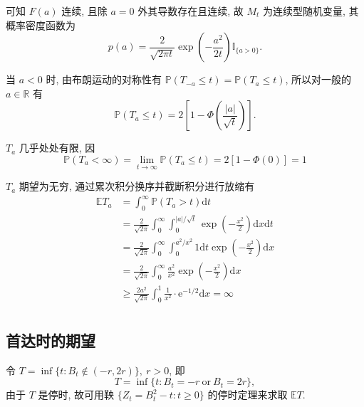 \documentclass[openany]{ctexbook}
\theoremstyle{kaiti}
\theoremstyle{normal}
\begin{document}
可知 $F(a)$ 连续, 且除 $a=0$ 外其导数存在且连续, 故 $M_t$ 为连续型随机变量, 其概率密度函数为
\begin{equation}
  p(a)=\frac{2}{\sqrt{2\pi t}}\exp\left(-\frac{a^2}{2t}\right)\mathbb{I}_{\{a>0\}}.
\end{equation}

当 $a<0$ 时, 由布朗运动的对称性有 $\mathbb{P}(T_{-a}\leqslant t)=\mathbb{P}(T_a\leqslant t)$, 所以对一般的 $a\in\mathbb{R}$ 有
\begin{equation}
  \mathbb{P}(T_a\leqslant t)=2\left[1-\Phi\left(\frac{|a|}{\sqrt{t}}\right)\right].
\end{equation}

$T_a$ 几乎处处有限, 因
\begin{equation}
  \mathbb{P}(T_a<\infty)=\lim_{t\to\infty}\mathbb{P}(T_a\leqslant t)=2[1-\Phi(0)]=1
\end{equation}

$T_a$ 期望为无穷, 通过累次积分换序并截断积分进行放缩有
\begin{equation}
  \begin{aligned}
    \mathbb{E}T_a
    &=\int_0^\infty \mathbb{P}(T_a>t)\mathrm{d}t\\
    &=\frac{2}{\sqrt{2\pi}}\int_0^\infty \int_0^{|a|/\sqrt{t}}\exp\left(-\frac{x^2}{2}\right)\mathrm{d}x\mathrm{d}t\\
    &=\frac{2}{\sqrt{2\pi}}\int_0^\infty \int_0^{a^2/x^2}1\mathrm{d}t\exp\left(-\frac{x^2}{2}\right)\mathrm{d}x\\
    &=\frac{2}{\sqrt{2\pi}}\int_0^\infty \frac{a^2}{x^2}\exp\left(-\frac{x^2}{2}\right)\mathrm{d}x\\
    &\geqslant\frac{2a^2}{\sqrt{2\pi}}\int_0^1\frac{1}{x^2}\cdot\mathrm{e}^{-1/2}\mathrm{d}x=\infty\\
  \end{aligned}
\end{equation}

\subsection{首达时的期望}
令 $T=\inf\{t:B_t\notin(-r,2r)\},~r>0$, 即
\begin{equation}
  T=\inf\{t:B_t=-r~\text{or}~B_t=2r\},
\end{equation}
由于 $T$ 是停时, 故可用鞅 $\{Z_t=B_t^2-t:t\geqslant0\}$ 的停时定理来求取 $\mathbb{E}T$.
\end{document}
